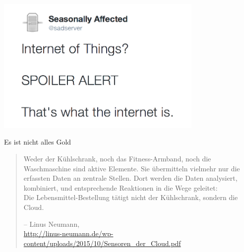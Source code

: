 \begin{frame}[fragile]
  \begin{center}
    \includegraphics[width=0.75\textwidth]{images/sadserver1}
    \label{fig:spoiler}
  \end{center}
\end{frame}

\begin{frame}{Es ist nicht alles Gold}
  \begin{center}
    \begin{quote}
      Weder der Kühlschrank, noch das Fitness-Armband, noch die
      Waschmaschine sind \alert{aktive Elemente}. Sie übermitteln
      vielmehr nur die erfassten Daten an \alert{zentrale Stellen}.
      Dort werden die Daten analysiert, kombiniert, und entsprechende
      Reaktionen in die Wege geleitet:\\
      Die Lebensmittel-Bestellung tätigt nicht der Kühlschrank,
      sondern \alert{die Cloud}.
      \begin{flushright}
        -- Linus Neumann,\\
        \tiny
        \url{http://linus-neumann.de/wp-content/uploads/2015/10/Sensoren_der_Cloud.pdf}
      \end{flushright}
    \end{quote}
  \end{center}
\end{frame}
